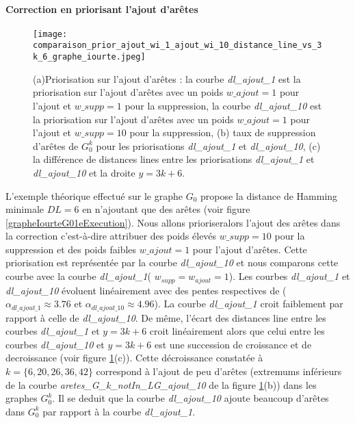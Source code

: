 \documentclass[onecolumn, 12pt]{book}
\begin{document}
\paragraph{Correction en priorisant l'ajout d'ar\^etes} %
\begin{figure}[htb!] 
\centering
\texttt{[image: comparaison\_prior\_ajout\_wi\_1\_ajout\_wi\_10\_distance\_line\_vs\_3k\_6\_graphe\_iourte.jpeg]}
\caption{(a)Priorisation sur l'ajout d'ar\^etes : la courbe {\em dl\_ajout\_1} est la priorisation sur l'ajout d'ar\^etes avec un poids $w\_ajout=1$ pour l'ajout et $w\_supp = 1$ pour la suppression,   la courbe {\em dl\_ajout\_10} est la priorisation sur l'ajout d'ar\^etes avec un poids $w\_ajout=1$ pour l'ajout et $w\_supp = 10$ pour la suppression, (b) taux de suppression d'ar\^etes de $G_0^k$ pour les priorisations  {\em dl\_ajout\_1} et  {\em dl\_ajout\_10}, (c) la diff\'erence de distances lines entre les priorisations {\em dl\_ajout\_1} et  {\em dl\_ajout\_10}  et la droite $y=3k+6$.  }
\label{priorAjout1Ajout10} 
\end{figure}
L'exemple th\'eorique effectu\'e sur le graphe $G_0$ propose la distance de Hamming minimale $DL= 6$ en n'ajoutant que des ar\^etes (voir figure \ref{grapheIourteG01eExecution}).
Nous allons prioriseralors  l'ajout des ar\^etes dans la correction c'est-\`a-dire attribuer des poids \'elev\'es  $w\_supp = 10$ pour la suppression et des poids faibles $w\_ajout = 1$ pour l'ajout d'ar\^etes. Cette priorisation est repr\'esent\'ee par la courbe {\em dl\_ajout\_10} et nous comparons  cette courbe  avec la courbe {\em dl\_ajout\_1}( $w_{supp} = w_{ajout} = 1$).
\newline
Les courbes {\em dl\_ajout\_1} et {\em dl\_ajout\_10} \'evoluent  lin\'eairement avec des pentes respectives de ($\alpha_{dl\_ajout\_1} \approx 3.76$ et $\alpha_{dl\_ajout\_10} \approx 4.96$).
La courbe {\em dl\_ajout\_1} croit faiblement par rapport \`a celle de {\em dl\_ajout\_10}.
De m\^eme, l'\'ecart des distances line entre les courbes {\em dl\_ajout\_1} et $y=3k+6$ croit lin\'eairement alors que celui entre les courbes {\em dl\_ajout\_10} et $y=3k+6$ est une succession de croissance et de decroissance (voir figure \ref{priorAjout1Ajout10}(c)). 
Cette d\'ecroissance constat\'ee \`a $k=\{6,20,26,36,42\}$ correspond \`a l'ajout de peu d'ar\^etes (extremums inf\'erieurs de la courbe {\em aretes\_G\_k\_notIn\_LG\_ajout\_10} de la figure \ref{priorAjout1Ajout10}(b)) dans les graphes $G_0^k$.
 Il se deduit que la courbe {\em dl\_ajout\_10} ajoute beaucoup d'ar\^etes dans $G_0^k$ par rapport \`a la courbe  {\em dl\_ajout\_1}. 
\end{document}
